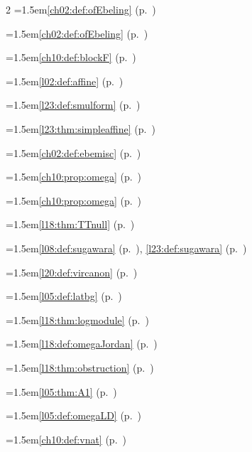 \begin{multicols}{2}
\hangindent=1.5em\quad \ref{ch02:def:ofEbeling} (p.~\pageref{ch02:def:ofEbeling})\par
\hangindent=1.5em\quad \ref{ch02:def:ofEbeling} (p.~\pageref{ch02:def:ofEbeling})\par
\hangindent=1.5em\quad \ref{ch10:def:blockF} (p.~\pageref{ch10:def:blockF})\par
\hangindent=1.5em\quad \ref{l02:def:affine} (p.~\pageref{l02:def:affine})\par
\hangindent=1.5em\quad \ref{l23:def:smulform} (p.~\pageref{l23:def:smulform})\par
\hangindent=1.5em\quad \ref{l23:thm:simpleaffine} (p.~\pageref{l23:thm:simpleaffine})\par
\hangindent=1.5em\quad \ref{ch02:def:ebemisc} (p.~\pageref{ch02:def:ebemisc})\par
\hangindent=1.5em\quad \ref{ch10:prop:omega} (p.~\pageref{ch10:prop:omega})\par
\hangindent=1.5em\quad \ref{ch10:prop:omega} (p.~\pageref{ch10:prop:omega})\par
\hangindent=1.5em\quad \ref{l18:thm:TTnull} (p.~\pageref{l18:thm:TTnull})\par
\hangindent=1.5em\quad \ref{l08:def:sugawara} (p.~\pageref{l08:def:sugawara}), \ref{l23:def:sugawara} (p.~\pageref{l23:def:sugawara})\par
\hangindent=1.5em\quad \ref{l20:def:vircanon} (p.~\pageref{l20:def:vircanon})\par
\hangindent=1.5em\quad \ref{l05:def:latbg} (p.~\pageref{l05:def:latbg})\par
\hangindent=1.5em\quad \ref{l18:thm:logmodule} (p.~\pageref{l18:thm:logmodule})\par
\hangindent=1.5em\quad \ref{l18:def:omegaJordan} (p.~\pageref{l18:def:omegaJordan})\par
\hangindent=1.5em\quad \ref{l18:thm:obstruction} (p.~\pageref{l18:thm:obstruction})\par
\hangindent=1.5em\quad \ref{l05:thm:A1} (p.~\pageref{l05:thm:A1})\par
\hangindent=1.5em\quad \ref{l05:def:omegaLD} (p.~\pageref{l05:def:omegaLD})\par
\hangindent=1.5em\quad \ref{ch10:def:vnat} (p.~\pageref{ch10:def:vnat})\par

\end{multicols}

